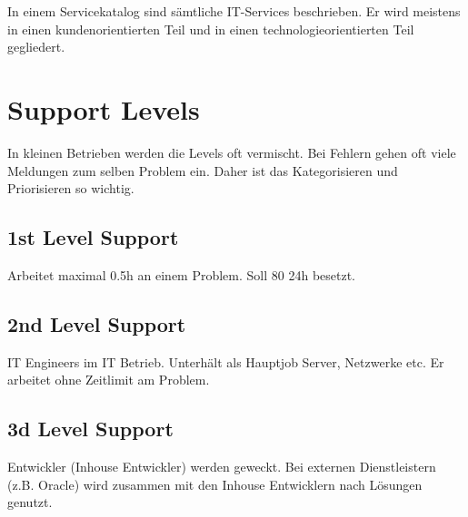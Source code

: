In einem Servicekatalog sind sämtliche IT-Services beschrieben. Er wird meistens in einen kundenorientierten Teil und in einen technologieorientierten Teil gegliedert.

\section{Support Levels}
In kleinen Betrieben werden die Levels oft vermischt.
Bei Fehlern gehen oft viele Meldungen zum selben Problem ein. Daher ist das Kategorisieren und Priorisieren so wichtig.
\subsection{1st Level Support}
Arbeitet maximal 0.5h an einem Problem. Soll 80%
24h besetzt.

\subsection{2nd Level Support}
IT Engineers im IT Betrieb. Unterhält als Hauptjob Server, Netzwerke etc. Er arbeitet ohne Zeitlimit am Problem.

\subsection{3d Level Support}
Entwickler (Inhouse Entwickler) werden geweckt. Bei externen Dienstleistern (z.B. Oracle) wird zusammen mit den Inhouse Entwicklern nach Lösungen genutzt.
